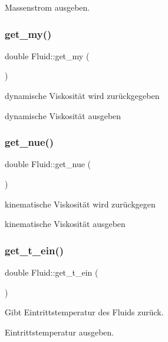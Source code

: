 Massenstrom ausgeben. \mbox{\label{class_fluid_a80d39a71b73f5ac4cffcaceb61b9e0ee}} 
\subsubsection{\texorpdfstring{get\+\_\+my()}{get\_my()}}
{\footnotesize\ttfamily double Fluid\+::get\+\_\+my (\begin{DoxyParamCaption}{ }\end{DoxyParamCaption})}



dynamische Viskosität wird zurückgegeben 

dynamische Viskosität ausgeben \mbox{\label{class_fluid_ae0031c0e8f70a4fb3dacc34c9725c3c1}} 
\subsubsection{\texorpdfstring{get\+\_\+nue()}{get\_nue()}}
{\footnotesize\ttfamily double Fluid\+::get\+\_\+nue (\begin{DoxyParamCaption}{ }\end{DoxyParamCaption})}



kinematische Viskosität wird zurückgegen 

kinematische Viskosität ausgeben \mbox{\label{class_fluid_a60d0c9269a8c8af00bf8828c7f764537}} 
\subsubsection{\texorpdfstring{get\+\_\+t\+\_\+ein()}{get\_t\_ein()}}
{\footnotesize\ttfamily double Fluid\+::get\+\_\+t\+\_\+ein (\begin{DoxyParamCaption}{ }\end{DoxyParamCaption})}



Gibt Eintrittstemperatur des Fluids zurück. 

Eintrittstemperatur ausgeben. \mbox{\label{class_fluid_af70884f77d5dd43499fcc70969100498}} 
